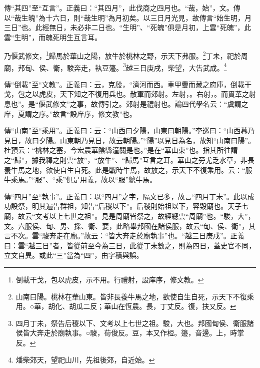 {\noindent\zhuan{}\fzbyks 傳“其四”至“互言”。正義曰：“其四月”，此伐商之四月也。“哉，始”，文。傳以“哉生魄”為十六日，則“哉生明”為月初矣。以三日月光見，故傳言“始生明，月三日”也。此經無日，未必非二日也。“生明”、“死魄”俱是月初，上雲“死魄”，此雲“生明”，而魄死明生互言耳。 \par}

乃偃武修文，\footnote{倒載干戈，包以虎皮，示不用。行禮射，設庠序，修文教。}歸馬於華山之陽，放牛於桃林之野，示天下弗服。\footnote{山南曰陽。桃林在華山東。皆非長養牛馬之地，欲使自生自死，示天下不復乘用。○華，胡化、胡瓜二反；華山在恆農。長，丁丈反。復，扶又反。}丁未，祀於周廟，邦甸、侯、衛，駿奔走，執豆籩。\footnote{四月丁未，祭告后稷以下、文考以上七世之祖。駿，大也。邦國甸侯、衛服諸侯皆大奔走於廟執事。○駿，荀俊反。豆，本又作梪。籩，音邊。上，時掌反。}越三日庚戌，柴望，大告武成。\footnote{燔柴郊天，望祀山川，先祖後郊，自近始。}

{\noindent\zhuan{}\fzbyks 傳“倒載”至“文教”。正義曰：云，克殷，“濟河而西。車甲釁而藏之府庫，倒載干戈，包之以虎皮，天下知之不復用兵也。散軍而郊射。左射，。右射，。而貫革之射息也”。是“偃武修文”之事，故傳引之。郊射是禮射也。論四代學名云：“虞謂之庠，夏謂之序。”故言“設庠序，修文教”也。 \par}

{\noindent\zhuan{}\fzbyks 傳“山南”至“乘用”。正義曰：云：“山西曰夕陽，山東曰朝陽。”李巡曰：“山西暮乃見日，故曰夕陽。山東朝乃見日，故云朝陽。”“陽”以見日為名，故知“山南曰陽”。杜預云：“桃林之塞，今宏農華陰縣潼關是也。”是在“華山東”也。指其所往謂之“歸”，據我釋之則雲“放”，“放牛”、“歸馬”互言之耳。華山之旁尤乏水草，非長養牛馬之地，欲使自生自死。此是戰時牛馬，故放之，示天下不復乘用。云：“服牛乘馬。”“服”、“乘”俱是用義，故以“服”總牛馬。 \par}

{\noindent\zhuan{}\fzbyks 傳“四月”至“執事”。正義曰：以“四月”之字，隔文已多，故言“四月丁未”。此以成功設祭，明其遍告群祖，知告“后稷以下”。后稷則始祖以下，容毀廟也。天子七廟，故云“文考以上七世之祖”。見是周廟皆祭之，故經總雲“周廟”也。“駿，大”，文。六服侯、甸、男、採、衛、要，此略舉邦國在諸侯服，故云“甸、侯、衛”，其言不次。雲“駿奔走在廟。”故云：“皆大奔走於廟執事”也。“越三日庚戌”。正義曰：雲“越三日”者，皆從前至今為三日，此從丁未數之，則為四日，蓋史官不同，立文自異。或此“三”當為“四”，由字積與誤。 \par}

